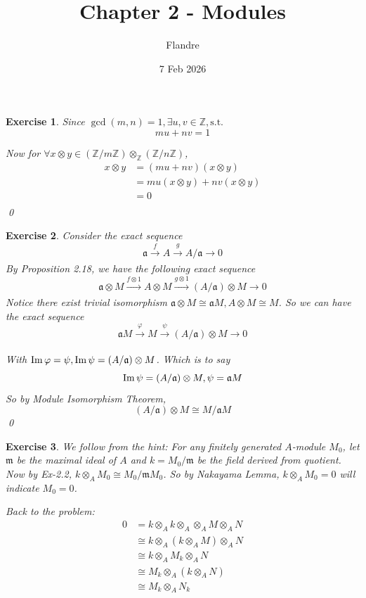 \documentclass{article}
\title{Chapter 2 - Modules}
\author{Flandre}
\date{7 Feb 2026}
\theoremstyle{breakstyle}
\newtheorem{exercise}{Exercise}
\let\ker\relax
\DeclareMathOperator{\ker}{Ker}
\DeclareMathOperator{\im}{Im}
\begin{document}
\maketitle

\begin{exercise}
    Since $\gcd(m,n)=1,\exists u,v\in \mathbb{Z},\text{s.t. }$
    $$
    mu+nv=1
    $$

    Now for $\forall x\otimes y\in \left( \mathbb{Z} /m\mathbb{Z} \right) \otimes _{\mathbb{Z}}\left( \mathbb{Z} / n\mathbb{Z} \right) $,
    \begin{align*}
        x\otimes y&= (mu+nv)(x\otimes y) \\
        &= mu(x\otimes y)+nv(x\otimes y) \\
        &= 0 \\
    \end{align*}
    \qed
\end{exercise}

\begin{exercise}
    Consider the exact sequence
    $$
    \mathfrak{a}\xrightarrow{f} A\xrightarrow[]{g} A / \mathfrak{a}\rightarrow 0
    $$
    By \emph{Proposition 2.18}, we have the following exact sequence
    $$
    \mathfrak{a}\otimes M\xrightarrow[]{f\otimes 1} A\otimes M\xrightarrow[]{g\otimes 1}\left( A / \mathfrak{a} \right)  \otimes M\longrightarrow 0
    $$
    Notice there exist trivial isomorphism $\mathfrak{a}\otimes M\cong \mathfrak{a}M,A\otimes M\cong M$.
    So we can have the exact sequence
    $$
    \mathfrak{a}M\xrightarrow[]{\varphi} M\xrightarrow[]{\psi} \left( A / \mathfrak{a} \right) \otimes M\rightarrow 0
    $$

    With $\im{\varphi}=\ker{\psi},\im{\psi}=\left( A / \mathfrak{a} \right) \otimes M$.
    Which is to say
    $$
    \im{\psi}=\left( A / \mathfrak{a} \right) \otimes M,\ker{\psi}=\mathfrak{a}M
    $$
    So by \emph{Module Isomorphism Theorem},
    $$
    \left( A / \mathfrak{a} \right) \otimes M\cong M / \mathfrak{a}M
    $$
    \qed
\end{exercise}

\begin{exercise}
    We follow from the hint:
    For any finitely generated $A$-module $M_0$,
    let $\mathfrak{m}$ be the maximal ideal of $A$ and $k=M_0 / \mathfrak{m}$ be the field derived from quotient.
    Now by \emph{Ex-2.2}, $k\otimes _{A}M_0\cong M_0 / \mathfrak{m}M_0$.
    So by \emph{Nakayama Lemma}, $k\otimes _{A}M_0=0$ will indicate $M_0=0$.

    Back to the problem:
    \begin{align*}
        0&= k\otimes _{A}k\otimes _{A}\otimes _{A}M\otimes _{A}N \\
        &\cong  k\otimes _{A}\left( k\otimes _{A}M \right) \otimes _{A}N \\
        &\cong  k\otimes _{A}M_{k} \otimes _{A}N \\
        &\cong  M_{k}\otimes _{A}\left( k\otimes _{A}N \right)  \\
        &\cong  M_{k}\otimes _{A}N_{k} \\
    \end{align*}
\end{exercise}
\end{document}
